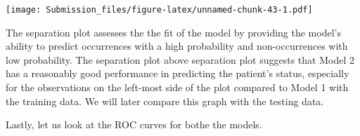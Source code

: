 \documentclass[
]{article}
\newenvironment{Shaded}{\begin{snugshade}}{\end{snugshade}}
\newcommand{\AttributeTok}[1]{\textcolor[rgb]{0.13,0.29,0.53}{#1}}
\newcommand{\CommentTok}[1]{\textcolor[rgb]{0.56,0.35,0.01}{\textit{#1}}}
\newcommand{\ConstantTok}[1]{\textcolor[rgb]{0.56,0.35,0.01}{#1}}
\newcommand{\DecValTok}[1]{\textcolor[rgb]{0.00,0.00,0.81}{#1}}
\newcommand{\DocumentationTok}[1]{\textcolor[rgb]{0.56,0.35,0.01}{\textbf{\textit{#1}}}}
\newcommand{\FunctionTok}[1]{\textcolor[rgb]{0.13,0.29,0.53}{\textbf{#1}}}
\newcommand{\NormalTok}[1]{#1}
\newcommand{\OtherTok}[1]{\textcolor[rgb]{0.56,0.35,0.01}{#1}}
\newcommand{\SpecialCharTok}[1]{\textcolor[rgb]{0.81,0.36,0.00}{\textbf{#1}}}
\newcommand{\StringTok}[1]{\textcolor[rgb]{0.31,0.60,0.02}{#1}}
\begin{document}
\begin{Shaded}
\end{Shaded}

\texttt{[image: Submission\_files/figure-latex/unnamed-chunk-43-1.pdf]}

The separation plot assesses the the fit of the model by providing the
model's ability to predict occurrences with a high probability and
non-occurrences with low probability. The separation plot above
separation plot suggests that Model 2 has a reasonably good performance
in predicting the patient's status, especially for the observations on
the left-most side of the plot compared to Model 1 with the training
data. We will later compare this graph with the testing data.

Lastly, let us look at the ROC curves for bothe the models.

\begin{Shaded}
\end{Shaded}
\end{document}
